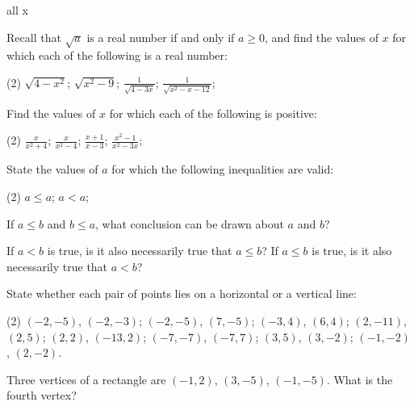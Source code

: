 \begin{questions}
\begin{solution}
\begin{tasks}
{\begin{note}
        \end{note}
        all x
      }
    \end{tasks}
  \end{solution}
  \item Recall that $\sqrt{a}$ is a real number if and only if $a \geq 0$, and find the values of $x$ for which each of the following is a real number:
  \begin{tasks}(2)
    \task $\sqrt{4-x^2}$;
    \task $\sqrt{x^2-9}$;
    \task \(\frac{1}{\sqrt{4-3x}}\);
    \task \(\frac{1}{\sqrt{x^2-x-12}}\);
  \end{tasks}
  \item Find the values of $x$ for which each of the following is positive:
  \begin{tasks}(2)
    \task \(\frac{x}{x^2+4}\);
    \task \(\frac{x}{x^2-4}\);
    \task \(\frac{x+1}{x-3}\);
    \task \(\frac{x^2-1}{x^2-3x}\);
  \end{tasks}
  \item State the values of $a$ for which the following inequalities are valid:
  \begin{tasks}(2)
    \task $a \leq a$;
    \task $a<a$;
  \end{tasks}
  \item If $a \leq b$ and $b \leq a$, what conclusion can be drawn about $a$ and $b$?
  \item \begin{tasks}
    \task If $a<b$ is true, is it also necessarily true that $a \leq b$?
    \task If $a \leq b$ is true, is it also necessarily true that $a<b$?
  \end{tasks}
  \item State whether each pair of points lies on a horizontal or a vertical line:
  \begin{tasks}(2)
    \task $(-2, -5)$, $(-2, -3)$;
    \task $(-2, -5)$, $(7, -5)$;
    \task $(-3, 4)$, $(6, 4)$;
    \task $(2, -11)$, $(2, 5)$;
    \task $(2, 2)$, $(-13, 2)$;
    \task $(-7, -7)$, $(-7, 7)$;
    \task $(3, 5)$, $(3, -2)$;
    \task $(-1, -2)$, $(2, -2)$.
  \end{tasks}
  \item Three vertices of a rectangle are $(-1, 2)$, $(3, -5)$, $(-1, -5)$. What is the fourth vertex?
\end{questions}